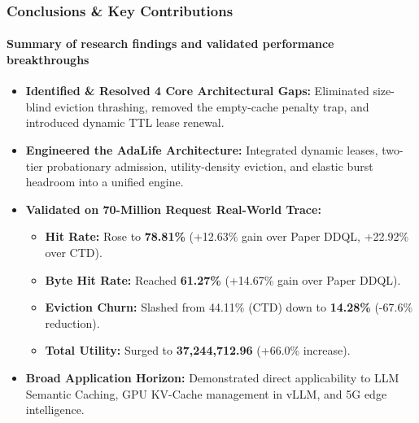 \documentclass[aspectratio=169, 10pt]{beamer}
\begin{document}
\begin{frame}
\begin{columns}[T, onlytextwidth]
        \vspace{0.2cm}
    \end{columns}
\end{frame}

\begin{frame}
    \frametitle{Conclusions \& Key Contributions}
    \framesubtitle{Summary of research findings and validated performance breakthroughs}

    \vspace{0.2cm}
    \begin{itemize}
        \setlength{\itemsep}{0.35cm}
        \item \textbf{Identified \& Resolved 4 Core Architectural Gaps:} Eliminated size-blind eviction thrashing, removed the empty-cache penalty trap, and introduced dynamic TTL lease renewal.
        \item \textbf{Engineered the AdaLife Architecture:} Integrated dynamic leases, two-tier probationary admission, utility-density eviction, and elastic burst headroom into a unified engine.
        \item \textbf{Validated on 70-Million Request Real-World Trace:}
        \begin{itemize}
            \footnotesize
            \item \textbf{Hit Rate:} Rose to \textbf{78.81\%} (+12.63\% gain over Paper DDQL, +22.92\% over CTD).
            \item \textbf{Byte Hit Rate:} Reached \textbf{61.27\%} (+14.67\% gain over Paper DDQL).
            \item \textbf{Eviction Churn:} Slashed from 44.11\% (CTD) down to \textbf{14.28\%} (-67.6\% reduction).
            \item \textbf{Total Utility:} Surged to \textbf{37,244,712.96} (+66.0\% increase).
        \end{itemize}
        \item \textbf{Broad Application Horizon:} Demonstrated direct applicability to LLM Semantic Caching, GPU KV-Cache management in vLLM, and 5G edge intelligence.
    \end{itemize}
\end{frame}
\end{document}
